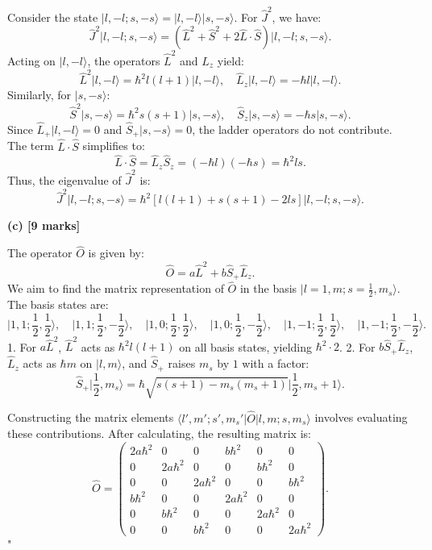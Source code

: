 Consider the state $\lvert l, -l; s, -s \rangle = \lvert l, -l \rangle \lvert s, -s \rangle$. For $\hat{J}^2$, we have:  
\[
\hat{J}^2 \lvert l, -l; s, -s \rangle = (\hat{L}^2 + \hat{S}^2 + 2 \hat{L} \cdot \hat{S}) \lvert l, -l; s, -s \rangle.
\]  
Acting on $\lvert l, -l \rangle$, the operators $\hat{L}^2$ and $\hat{L}_z$ yield:  
\[
\hat{L}^2 \lvert l, -l \rangle = \hbar^2 l(l+1) \lvert l, -l \rangle, \quad \hat{L}_z \lvert l, -l \rangle = -\hbar l \lvert l, -l \rangle.
\]  
Similarly, for $\lvert s, -s \rangle$:  
\[
\hat{S}^2 \lvert s, -s \rangle = \hbar^2 s(s+1) \lvert s, -s \rangle, \quad \hat{S}_z \lvert s, -s \rangle = -\hbar s \lvert s, -s \rangle.
\]  
Since $\hat{L}_+ \lvert l, -l \rangle = 0$ and $\hat{S}_+ \lvert s, -s \rangle = 0$, the ladder operators do not contribute. The term $\hat{L} \cdot \hat{S}$ simplifies to:  
\[
\hat{L} \cdot \hat{S} = \hat{L}_z \hat{S}_z = (-\hbar l)(-\hbar s) = \hbar^2 ls.
\]  
Thus, the eigenvalue of $\hat{J}^2$ is:  
\[
\hat{J}^2 \lvert l, -l; s, -s \rangle = \hbar^2 \left[ l(l+1) + s(s+1) - 2ls \right] \lvert l, -l; s, -s \rangle.
\]  

\textbf{(c) [9 marks]}  

The operator $\hat{O}$ is given by:  
\[
\hat{O} = a \hat{L}^2 + b \hat{S}_+ \hat{L}_z.
\]  
We aim to find the matrix representation of $\hat{O}$ in the basis $\lvert l = 1, m; s = \frac{1}{2}, m_s \rangle$. The basis states are:  
\[
\lvert 1, 1; \frac{1}{2}, \frac{1}{2} \rangle, \quad \lvert 1, 1; \frac{1}{2}, -\frac{1}{2} \rangle, \quad \lvert 1, 0; \frac{1}{2}, \frac{1}{2} \rangle, \quad \lvert 1, 0; \frac{1}{2}, -\frac{1}{2} \rangle, \quad \lvert 1, -1; \frac{1}{2}, \frac{1}{2} \rangle, \quad \lvert 1, -1; \frac{1}{2}, -\frac{1}{2} \rangle.
\]  
1. For $a \hat{L}^2$, $\hat{L}^2$ acts as $\hbar^2 l(l+1)$ on all basis states, yielding $\hbar^2 \cdot 2$.  
2. For $b \hat{S}_+ \hat{L}_z$, $\hat{L}_z$ acts as $\hbar m$ on $\lvert l, m \rangle$, and $\hat{S}_+$ raises $m_s$ by $1$ with a factor:  
\[
\hat{S}_+ \lvert \frac{1}{2}, m_s \rangle = \hbar \sqrt{s(s+1) - m_s(m_s + 1)} \lvert \frac{1}{2}, m_s + 1 \rangle.
\]  

Constructing the matrix elements $\langle l', m'; s', m_s' \lvert \hat{O} \rvert l, m; s, m_s \rangle$ involves evaluating these contributions. After calculating, the resulting matrix is:  
\[
\hat{O} = 
\begin{pmatrix}
2a\hbar^2 & 0 & 0 & b\hbar^2 & 0 & 0 \\
0 & 2a\hbar^2 & 0 & 0 & b\hbar^2 & 0 \\
0 & 0 & 2a\hbar^2 & 0 & 0 & b\hbar^2 \\
b\hbar^2 & 0 & 0 & 2a\hbar^2 & 0 & 0 \\
0 & b\hbar^2 & 0 & 0 & 2a\hbar^2 & 0 \\
0 & 0 & b\hbar^2 & 0 & 0 & 2a\hbar^2
\end{pmatrix}.
\]  
"

